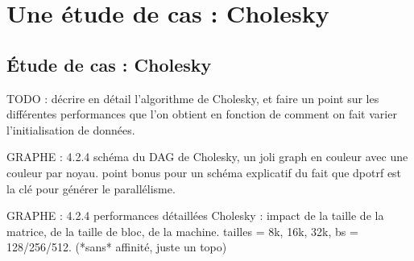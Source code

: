 \section{Une étude de cas : Cholesky}


\subsection{Étude de cas : Cholesky}
\label{chap:contribs:apps:cholesky}

TODO : décrire en détail l'algorithme de Cholesky, et faire un point sur les différentes performances que l'on obtient en fonction de comment on fait varier l'initialisation de données.

GRAPHE : 4.2.4 schéma du DAG de Cholesky, un joli graph en couleur avec une couleur par noyau. point bonus pour un schéma explicatif du fait que dpotrf est la clé pour générer le parallélisme.

GRAPHE : 4.2.4 performances détaillées Cholesky : impact de la taille de la matrice, de la taille de bloc, de la machine. tailles = 8k, 16k, 32k, bs = 128/256/512. (*sans* affinité, juste un topo)

